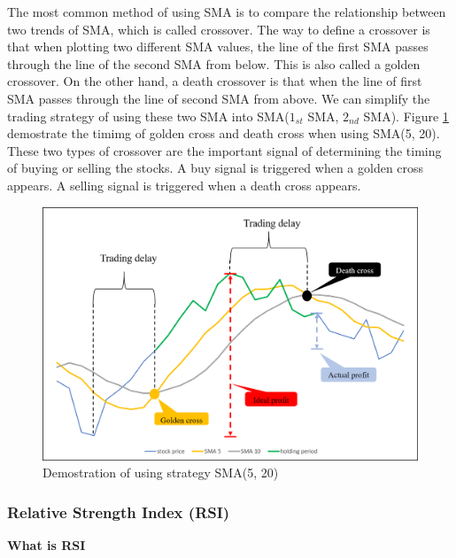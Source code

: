 \documentclass[../main.tex]{subfiles}
\begin{document}
The most common method of using SMA is to compare the relationship between two trends of SMA, which is called crossover. The way to define a crossover is that when plotting two different SMA values, the line of the first SMA passes through the line of the second SMA from below. This is also called a golden crossover. On the other hand, a death crossover is that when the line of first SMA passes through the line of second SMA from above. We can simplify the trading strategy of using these two SMA into SMA($1_{st}$ SMA, $2_{nd}$ SMA). Figure \ref{cross_demo} demostrate the timimg of golden cross and death cross when using SMA(5, 20). These two types of crossover are the important signal of determining the timing of buying or selling the stocks. A buy signal is triggered when a golden cross appears. A selling signal is triggered when a death cross appears.
\bigbreak

\begin{figure}
    \centering
    \includegraphics[scale = 0.6] {figure/cross1.png}
    \caption{Demostration of using strategy SMA(5, 20)}
    \label{cross_demo}
\end{figure}


\bigbreak

\subsubsection{Relative Strength Index (RSI)}
\textbf{What is RSI}
\end{document}

